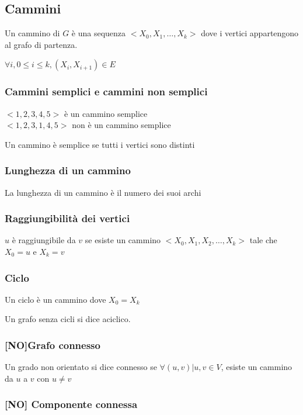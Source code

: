 \documentclass[11pt,a4paper,twoside,openright]{book}
\begin{document}
\subsection{Cammini}

{Un cammino di $G$ è una sequenza $<X_0,X_1,\ldots,X_k>$ dove i vertici appartengono al grafo di partenza.}

$\forall i,0\leq i\leq k,(X_i,X_{i+1})\in E$

\subsubsection{Cammini semplici e cammini non semplici}

$<1,2,3,4,5>$ è un cammino semplice\\
$<1,2,3,1,4,5>$ non è un cammino semplice

{Un cammino è semplice se tutti i vertici sono distinti}

\subsubsection{Lunghezza di un cammino}

{La lunghezza di un cammino è il numero dei suoi archi}

\subsubsection{Raggiungibilità dei vertici}

$u$ è raggiungibile da $v$ se esiste un cammino $<X_0,X_1,X_2,\ldots,X_k>$ tale che $X_0 = u$ e $X_k = v$

\subsubsection{Ciclo}

{Un ciclo è un cammino dove $X_0 = X_k$}

{Un grafo senza cicli si dice aciclico.}

\subsubsection{{[}NO{]}Grafo connesso}

{Un grado non orientato si dice connesso se $\forall (u,v) | u,v \in V$, esiste un cammino da $u$ a $v$ con $u\neq v$}

\subsubsection{{[}NO{]} Componente connessa}
\end{document}
